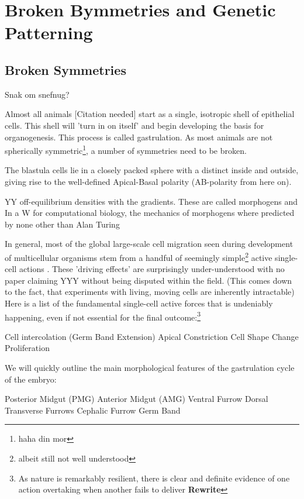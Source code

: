 \section{Broken Bymmetries and Genetic Patterning}
\subsection{Broken Symmetries}

Snak om snefnug?

Almost all animals [Citation needed] start as a single, isotropic shell of epithelial cells. This shell will 'turn in on itself' and begin developing the basis for organogenesis. This process is called gastrulation. As most animals are not spherically symmetric\footnote{haha din mor}, a number of symmetries need to be broken. 

The blastula cells lie in a closely packed sphere with a distinct inside and outside, giving rise to the well-defined Apical-Basal polarity (AB-polarity from here on).

YY off-equilibrium densities with the gradients. These are called morphogens and 
In a W for computational biology, the mechanics of morphogens where predicted by none other than Alan Turing

In general, most of the global large-scale cell migration seen during development of multicellular organisms stem from a handful of seemingly simple\footnote{albeit still not well understood} active single-cell actions \cite{walck2014cell}. These 'driving effects' are surprisingly under-understood with no paper claiming YYY without being disputed within the field. (This comes down to the fact, that experiments with living, moving cells are inherently intractable) Here is a list of the fundamental single-cell active forces that is undeniably happening, even if not essential for the final outcome:\footnote{As nature is remarkably resilient, there is clear and definite evidence of one action overtaking when another fails to deliver \cite{butler2009cell} \textbf{Rewrite}} 
\begin{outline}
    \1 Cell intercolation (Germ Band Extension)
    \1 Apical Constriction
    \1 Cell Shape Change
    \1 Proliferation
\end{outline}

We will quickly outline the main morphological features of the gastrulation cycle of the embryo:
\begin{outline}
    \1 Posterior Midgut (PMG)
    \1 Anterior Midgut (AMG)
    \1 Ventral Furrow
    \1 Dorsal Transverse Furrows
    \1 Cephalic Furrow
    \1 Germ Band
\end{outline}

